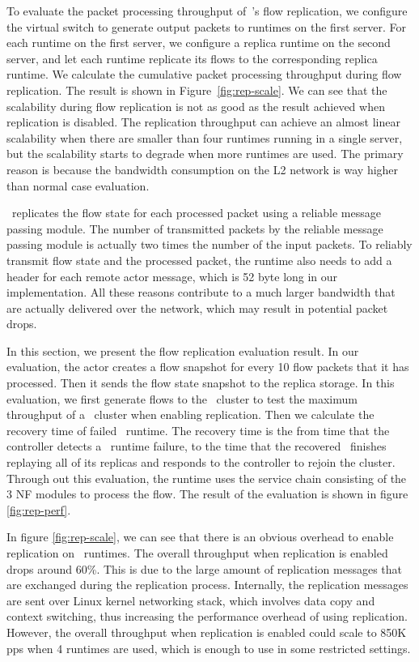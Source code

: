 To evaluate the packet processing throughput of~\nfactor's flow replication, we configure the virtual switch to generate output packets to runtimes on the first server. For each runtime on the first server, we configure a replica runtime on the second server, and let each runtime replicate its flows to the corresponding replica runtime. We calculate the cumulative packet processing throughput during flow replication. The result is shown in Figure~\ref{fig:rep-scale}. We can see that the scalability during flow replication is not as good as the result achieved when replication is disabled. The replication throughput can achieve an almost linear scalability when there are smaller than four runtimes running in a single server, but the scalability starts to degrade when more runtimes are used. The primary reason is because the bandwidth consumption on the L2 network is way higher than normal case evaluation.

~\nfactor replicates the flow state for each processed packet using a reliable message passing module. The number of transmitted packets by the reliable message passing module is actually two times the number of the input packets. To reliably transmit flow state and the processed packet, the runtime also needs to add a header for each remote actor message, which is 52 byte long in our implementation. All these reasons contribute to a much larger bandwidth that are actually delivered over the network, which may result in potential packet drops.

In this section, we present the flow replication evaluation result. In our evaluation, the actor creates a flow snapshot for every 10 flow packets that it has processed. Then it sends the flow state snapshot to the replica storage. In this evaluation, we first generate flows to the \nfactor~cluster to test the maximum throughput of a \nfactor~cluster when enabling replication. Then we calculate the recovery time of failed \nfactor~runtime. The recovery time is the from time that the controller detects a \nfactor~runtime failure, to the time that the recovered \nfactor~finishes replaying all of its replicas and responds to the controller to rejoin the cluster. Through out this evaluation, the runtime uses the service chain consisting of the 3 NF modules to process the flow. The result of the evaluation is shown in figure \ref{fig:rep-perf}.

In figure \ref{fig:rep-scale}, we can see that there is an obvious overhead to enable replication on \nfactor~runtimes. The overall throughput when replication is enabled drops around 60\%. This is due to the large amount of replication messages that are exchanged during the replication process. Internally, the replication messages are sent over Linux kernel networking stack, which involves data copy and context switching, thus increasing the performance overhead of using replication. However, the overall throughput when replication is enabled could scale to 850K pps when 4 runtimes are used, which is enough to use in some restricted settings.

